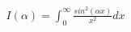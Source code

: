 \documentclass[preview]{standalone}
\begin{document}
\begin{align*}
I(\alpha) = \int_{0}^{\infty}\frac{sin^2(\alpha x)}{x^2}dx
\end{align*}
\end{document}

